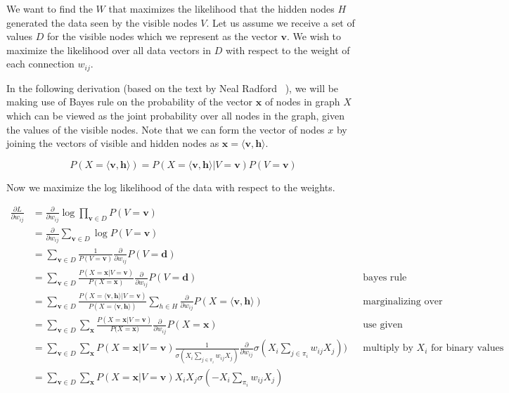 \documentclass[11pt]{amsart}
\newcommand{\vek}[1]{\mathbf{#1}}
\begin{document}
We want to find the $W$ that maximizes the likelihood that the hidden nodes $H$ generated the data seen by the visible nodes $V$. Let us assume we receive a set of values $D$ for the visible nodes which we represent as the vector $\vek{v}$. We wish to maximize the likelihood over all data vectors in $D$ with respect to the weight of each connection $w_{ij}$.

In the following derivation (based on the text by Neal Radford ~\cite{neal1992connectionist}), we will be making use of Bayes rule on the probability of the vector $\vek{x}$ of nodes in graph $X$ which can be viewed as the joint probability over all nodes in the graph, given the values of the visible nodes. Note that we can form the vector of nodes $x$ by joining the vectors of visible and hidden nodes as $\vek{x} = \langle \vek{v}, \vek{h} \rangle$.

\begin{equation}
P(X= \langle \vek{v}, \vek{h} \rangle) = P(X = \langle \vek{v}, \vek{h} \rangle \vert V = \vek{v}) P(V = \vek{v})
\end{equation}

Now we maximize the log likelihood of the data with respect to the weights.

\begin{equation}
\begin{aligned}
\frac{\partial L}{\partial w_{ij}} &= \frac{\partial}{\partial w_{ij}} \log \prod_{\vek{v} \in D} P(V = \vek{v}) \\
						 & =  \frac{\partial}{\partial w_{ij}} \sum_{\vek{v} \in D} \log P(V = \vek{v}) \\
						 & =  \sum_{\vek{v} \in D}  \frac{1}{P(V = \vek{v})} \frac{\partial}{\partial w_{ij}} P(V = \vek{d}) \\
						 & =  \sum_{\vek{v} \in D}  \frac{P(X = \vek{x} \vert V = \vek{v})}{P(X = \vek{x})} \frac{\partial}{\partial w_{ij}} P(V = \vek{d}) && \text{bayes rule}\\
						 & = \sum_{\vek{v} \in D}  \frac{P(X = \langle \vek{v}, \vek{h} \rangle \vert V = \vek{v})}{P(X = \langle \vek{v}, \vek{h} \rangle)}  \sum_{h \in H} \frac{\partial}{\partial w_{ij}} P(X=\langle \vek{v}, \vek{h} \rangle) && \text{marginalizing over H} \\
						 & = \sum_{\vek{v} \in D}   \sum_{\vek{x}} \frac{P(X = \vek{x}  \vert V = \vek{v})}{P(X = \vek{x)}}  \frac{\partial}{\partial w_{ij}} P(X=\vek{x}) && \text{use given parametrization} \\
						 & = \sum_{\vek{v} \in D}   \sum_{\vek{x}} P(X = \vek{x}  \vert V = \vek{v}) \frac{1}{\sigma(X_i \sum_{j \in \pi_i} w_{ij}X_j)} \frac{\partial}{\partial w_{ij}} \sigma(X_i \sum_{j \in \pi_i} w_{ij}X_j)) && \text{multiply by $X_i$ for binary values} \\
						 & = \sum_{\vek{v} \in D}   \sum_{\vek{x}} P(X = \vek{x}  \vert V = \vek{v}) X_{i} X_{j} \sigma(-X_{i} \sum_{\pi_i} w_{ij} X_{j})
\end{aligned}
\end{equation}
\end{document}
